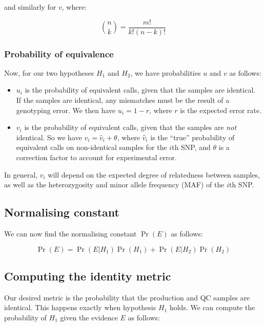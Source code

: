 \documentclass{article}
\begin{document}
and similarly for $v$, where:

\begin{displaymath}
\binom{n}{k} = \frac{m!}{k!(n-k)!}
\end{displaymath}

\subsubsection*{Probability of equivalence}

Now, for our two hypotheses $H_1$ and $H_2$, we have probabilities $u$ and $v$ as follows:

\begin{itemize}
\item $u_{i}$ is the probability of equivalent calls, given that the samples are identical. If the samples are identical, any mismatches must be the result of a genotyping error. We then have $u_{i} = 1 - r$, where $r$ is the expected error rate.
\item $v_{i}$ is the probability of equivalent calls, given that the samples are \emph{not} identical. So we have $v_{i} = \hat{v}_{i} + \theta$, where $\hat{v}_{i}$ is the ``true'' probability of equivalent calls on non-identical samples for the $i$th SNP, and $\theta$ is a correction factor to account for experimental error.
\end{itemize}

In general, $v_i$ will depend on the expected degree of relatedness between samples, as well as the heterozygosity and minor allele frequency (MAF) of the $i$th SNP.

\subsection*{Normalising constant}

We can now find the normalising constant $\Pr(E)$ as follows:

\begin{displaymath}
\Pr(E) = \Pr(E|H_{1})\Pr(H_{1}) + \Pr(E|H_{2})\Pr(H_{2})
\end{displaymath}

\subsection*{Computing the identity metric}

Our desired metric is the probability that the production and QC samples are identical. This happens exactly when hypothesis $H_1$ holds. We can compute the probability of $H_1$ given the evidence $E$ as follows:
\end{document}
